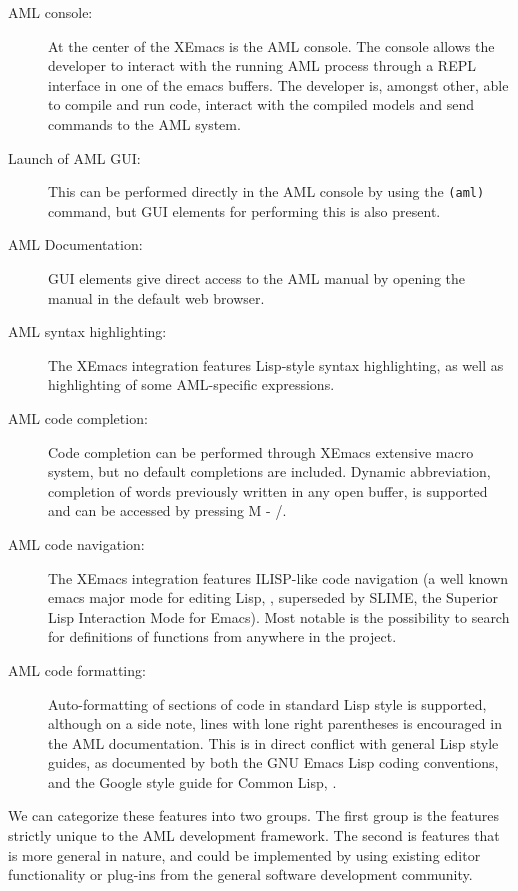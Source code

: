 \begin{description}
    \item[AML console:] At the center of the XEmacs is the AML console. The console allows the developer to interact with the running AML process through a REPL interface in one of the emacs buffers. The developer is, amongst other, able to compile and run code, interact with the compiled models and send commands to the AML system.

    \item[Launch of AML GUI:] This can be performed directly in the AML console by using the \texttt{(aml)} command, but GUI elements for performing this is also present.

    \item[AML Documentation:] GUI elements give direct access to the AML manual by opening the manual in the default web browser.

    \item[AML syntax highlighting:] The XEmacs integration features Lisp-style syntax highlighting, as well as highlighting of some AML-specific expressions.

    \item[AML code completion:] Code completion can be performed through XEmacs extensive macro system, but no default completions are included. Dynamic abbreviation, completion of words previously written in any open buffer, is supported and can be accessed by pressing {M - /}.

    \item[AML code navigation:] The XEmacs integration features ILISP-like code navigation (a well known emacs major mode for editing Lisp, \cite{cliki}, superseded by SLIME, the Superior Lisp Interaction Mode for Emacs). Most notable is the possibility to search for definitions of functions from anywhere in the project.

    \item[AML code formatting:] Auto-formatting of sections of code in standard Lisp style is supported, although on a side note, lines with lone right parentheses is encouraged in the AML documentation. This is in direct conflict with general Lisp style guides, as documented by both the GNU Emacs Lisp coding conventions, \cite{gnu} and the Google style guide for Common Lisp, \cite{google}.
\end{description}

We can categorize these features into two groups. The first group is the features strictly unique to the AML development framework. The second is features that is more general in nature, and could be implemented by using existing editor functionality or plug-ins from the general software development community.

